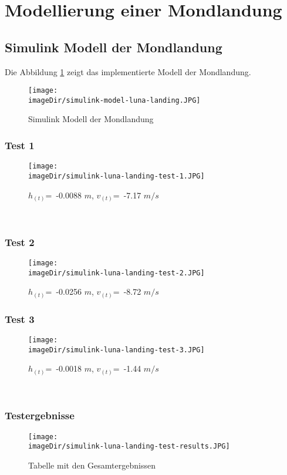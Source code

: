 \section{Modellierung einer Mondlandung}
\label{sec:modeling-luna-landing}

\subsection{Simulink Modell der Mondlandung}
\label{sec:sub-simulink-model-luna-landing}
Die Abbildung \ref{fig:simulink-model-luna-landing} zeigt das implementierte Modell der Mondlandung.
\begin{figure}[h]
	\centering
	\texttt{[image: \\imageDir/simulink-model-luna-landing.JPG]}
	\caption{Simulink Modell der Mondlandung}
	\label{fig:simulink-model-luna-landing}
\end{figure}

\subsubsection{Test 1}
\begin{figure}[h]
	\centering
	\texttt{[image: \\imageDir/simulink-luna-landing-test-1.JPG]}
	\caption{$h_{(t)}$=~-0.0088 $m$, $v_{(t)}$=~-7.17 $m/s$}
	\label{fig:simulink-luna-landing-test-1}
\end{figure}
\ \newpage

\subsubsection{Test 2}
\begin{figure}[h]
	\centering
	\texttt{[image: \\imageDir/simulink-luna-landing-test-2.JPG]}
	\caption{$h_{(t)}$=~-0.0256 $m$, $v_{(t)}$=~-8.72 $m/s$}
	\label{fig:simulink-luna-landing-test-2}
\end{figure}

\subsubsection{Test 3}
\begin{figure}[h]
	\centering
	\texttt{[image: \\imageDir/simulink-luna-landing-test-3.JPG]}
	\caption{$h_{(t)}$=~-0.0018 $m$, $v_{(t)}$=~-1.44 $m/s$}
	\label{fig:simulink-luna-landing-test-3}
\end{figure}
\ \newpage

\subsubsection{Testergebnisse}
\label{sec:simulink-luna-landing-test-results}
\begin{figure}[h]
	\centering
	\texttt{[image: \\imageDir/simulink-luna-landing-test-results.JPG]}
	\caption{Tabelle mit den Gesamtergebnissen}
	\label{fig:simulink-luna-landing-test-result}
\end{figure}



